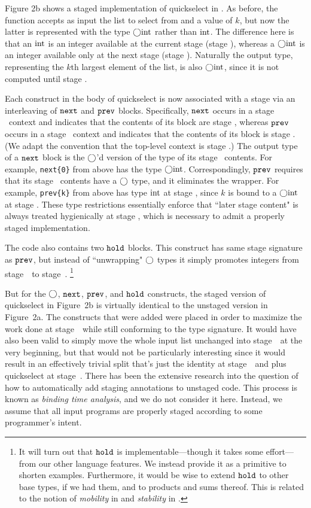 Figure 2b shows a staged implementation of quickselect in \lang.
As before, the function accepts as input the list to select from and a value of $k$,
but now the latter is represented with the type $\bigcirc{\rm int}$ rather than ${\rm int}$.
The difference here is that an ${\rm int}$ is an integer available at the current stage (stage \bbone), 
whereas a $\bigcirc{\rm int}$ is an integer available only at the next stage (stage \bbtwo).
Naturally the output type, representing the $k$th largest element of the list,
is also $\bigcirc{\rm int}$, since it is not computed until stage \bbtwo.

Each construct in the body of quickselect is now associated with a stage via an interleaving of ${\tt next}$ and ${\tt prev}$ blocks.  
Specifically, ${\tt next}$ occurs in a stage \bbone\ context and indicates that the contents of its block are stage \bbtwo, 
whereas ${\tt prev}$ occurs in a stage \bbtwo\ context and indicates that the contents of its block is stage \bbone.
(We adapt the convention that the top-level context is stage \bbone.)
The output type of a ${\tt next}$ block is the $\bigcirc$'d version of the type of its stage \bbtwo\ contents.  
For example, \verb|next{0}| from above has the type $\bigcirc{\rm int}$.
Correspondingly, ${\tt prev}$ requires that its stage \bbone\ contents have a $\bigcirc$ type, and it eliminates the wrapper.
For example, \verb|prev{k}| from above has type ${\rm int}$ at stage \bbtwo, since $k$ is bound to a $\bigcirc{\rm int}$ at stage \bbone.
These type restrictions essentially enforce that ``later stage content" is always treated hygienically at stage \bbone,
which is necessary to admit a properly staged implementation.

The code also contains two ${\tt hold}$ blocks.  
This construct has same stage signature as ${\tt prev}$,
but instead of ``unwrapping" $\bigcirc$ types it simply promotes integers from stage~\bbone\ to stage~\bbtwo.
\footnote{It will turn out that ${\tt hold}$ is implementable---though it takes some effort---from our other language features.
We instead provide it as a primitive to shorten examples.  
Furthermore, it would be wise to extend ${\tt hold}$ to other base types, if we had them, and to products and sums thereof.
This is related to the notion of {\em mobility} in \cite{murphy05} and {\em stability} in \cite{krishnaswami13}.}

But for the $\bigcirc$, ${\tt next}$, ${\tt prev}$, and ${\tt hold}$ constructs, 
the staged version of quickselect in Figure~2b is virtually identical to the unstaged version in Figure~2a.
The constructs that were added were placed in order to maximize the work done at stage~\bbone\ while still conforming to the type signature.
It would have also been valid to simply move the whole input list unchanged into stage~\bbtwo\ at the very beginning, 
but that would not be particularly interesting since it would result in an effectively trivial split 
that's just the identity at stage~\bbone\ and plus quickselect at stage~\bbtwo.
There has been the extensive research into the question of how to automatically add staging annotations to unstaged code.
This process is known as {\em binding time analysis}, and we do not consider it here.
Instead, we assume that all input programs are properly staged according to some programmer's intent.
